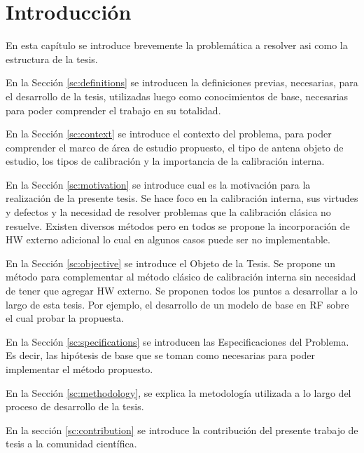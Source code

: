 
\chapter{Introducción} %

\label{ch:introduccion} %

En esta capítulo se introduce brevemente la problemática a resolver asi como la estructura de la tesis.

En la Sección \ref{sc:definitions} se introducen la definiciones previas, necesarias, para el desarrollo de la tesis, utilizadas
luego como conocimientos de base, necesarias para poder comprender el trabajo en su totalidad.

En la Sección \ref{sc:context} se introduce el contexto del problema, para poder comprender el marco de área de estudio
propuesto, el tipo de antena objeto de estudio, los tipos de calibración y la importancia de la calibración interna.

En la Sección \ref{sc:motivation} se introduce cual es la motivación para la realización de la presente tesis. Se hace foco
en la calibración interna, sus virtudes y defectos y la necesidad de resolver problemas que la calibración clásica no resuelve.
Existen diversos métodos pero en todos se propone la incorporación de HW externo adicional lo cual en algunos casos puede ser
no implementable.

En la Sección \ref{sc:objective} se introduce el Objeto de la Tesis. Se propone un método para complementar al método clásico
de calibración interna sin necesidad de tener que agregar HW externo. Se proponen todos los puntos a desarrollar a lo largo de
esta tesis. Por ejemplo, el desarrollo de un modelo de base en RF sobre el cual probar la propuesta.

En la Sección \ref{sc:specifications} se introducen las Especificaciones del Problema. Es decir, las hipótesis de base que se
toman como necesarias para poder implementar el método propuesto.

En la Sección \ref{sc:methodology}, se explica la metodología utilizada a lo largo del proceso de desarrollo de la tesis.

En la sección \ref{sc:contribution} se introduce la contribución del presente trabajo de tesis a la comunidad científica.

